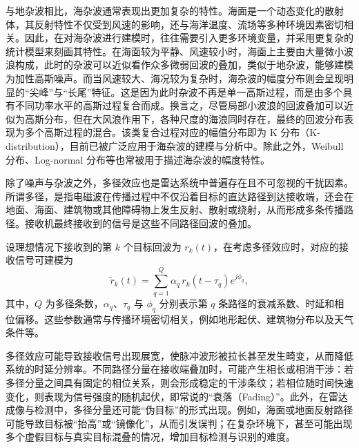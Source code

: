 与地杂波相比，海杂波通常表现出更加复杂的特性。海面是一个动态变化的散射体，其反射特性不仅受到风速的影响，还与海洋温度、流场等多种环境因素密切相关。因此，在对海杂波进行建模时，往往需要引入更多环境变量，并采用更复杂的统计模型来刻画其特性。在海面较为平静、风速较小时，海面上主要由大量微小波浪构成，此时的杂波可以近似看作众多微弱回波的叠加，类似于地杂波，能够建模为加性高斯噪声。而当风速较大、海况较为复杂时，海杂波的幅度分布则会呈现明显的``尖峰''与``长尾''特征。这是因为此时杂波不再是单一高斯过程，而是由多个具有不同功率水平的高斯过程复合而成。换言之，尽管局部小波浪的回波叠加可以近似为高斯分布，但在大风浪作用下，各种尺度的海浪同时存在，最终的回波分布表现为多个高斯过程的混合。该类复合过程对应的幅值分布即为 K 分布（K-distribution），目前已被广泛应用于海杂波的建模与分析中。除此之外，Weibull 分布、Log-normal 分布等也常被用于描述海杂波的幅度特性。

除了噪声与杂波之外，多径效应也是雷达系统中普遍存在且不可忽视的干扰因素。所谓多径，是指电磁波在传播过程中不仅沿着目标的直达路径到达接收端，还会在地面、海面、建筑物或其他障碍物上发生反射、散射或绕射，从而形成多条传播路径。接收机最终接收到的信号是这些不同路径回波的叠加。

设理想情况下接收到的第 \( k \) 个目标回波为 \( r_k(t) \)，在考虑多径效应时，对应的接收信号可建模为
\begin{equation}
    \tilde{r}_k(t) = \sum_{q=1}^{Q} \alpha_q \, r_k\!\left(t - \tau_q\right) e^{j \phi_q},
\end{equation}
其中，\( Q \) 为多径条数，\(\alpha_q\)、\(\tau_q\) 与 \(\phi_q\) 分别表示第 \( q \) 条路径的衰减系数、时延和相位偏移。这些参数通常与传播环境密切相关，例如地形起伏、建筑物分布以及天气条件等。

多径效应可能导致接收信号出现展宽，使脉冲波形被拉长甚至发生畸变，从而降低系统的时延分辨率。不同路径分量在接收端叠加时，可能产生相长或相消干涉：若多径分量之间具有固定的相位关系，则会形成稳定的干涉条纹；若相位随时间快速变化，则表现为信号强度的随机起伏，即常说的``衰落（Fading）''。此外，在雷达成像与检测中，多径分量还可能``伪目标''的形式出现。例如，海面或地面反射路径可能导致目标被``抬高''或``镜像化''，从而引发误判；在复杂环境下，甚至可能出现多个虚假目标与真实目标混叠的情况，增加目标检测与识别的难度。
